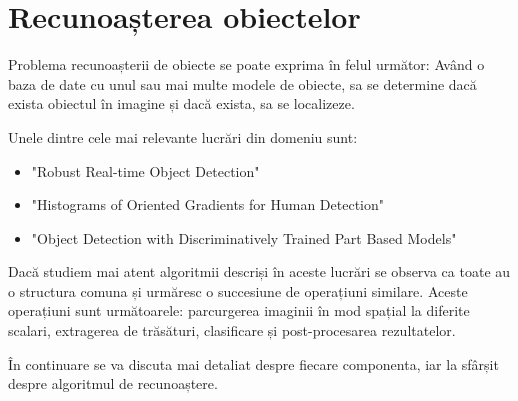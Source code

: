 \chapter{Recunoașterea obiectelor}




Problema recunoașterii de obiecte se poate exprima în felul următor:
Având o baza de date cu unul sau mai multe modele de obiecte, sa se determine dacă exista obiectul în imagine și dacă exista, sa se localizeze.

Unele dintre cele mai relevante lucrări din domeniu sunt: 
\begin{itemize}
	\item "Robust Real-time Object Detection" \cite{Viola01robustreal-time}
	\item "Histograms of Oriented Gradients for Human Detection" \cite{Dalal05histogramsof}
	\item "Object Detection with Discriminatively Trained Part Based Models" \cite{Felzenszwalb_objectdetection}
\end{itemize}

Dacă studiem mai atent algoritmii descriși în aceste lucrări se observa ca toate au o structura comuna și urmăresc o succesiune de operațiuni similare.
Aceste operațiuni sunt următoarele: parcurgerea imaginii în mod spațial la diferite scalari, extragerea de trăsături, clasificare și post-procesarea rezultatelor.

În continuare se va discuta mai detaliat despre fiecare componenta, iar la sfârșit despre algoritmul de recunoaștere.

